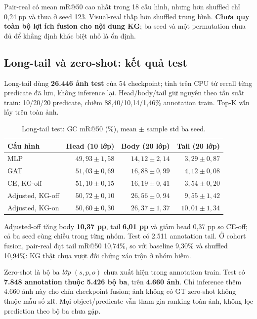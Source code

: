 Pair-real có mean mR@50 cao nhất trong 18 cấu hình, nhưng hơn shuffled
chỉ 0,24 pp và thua ở seed 123. Visual-real thấp hơn shuffled trung bình.
\textbf{Chưa quy toàn bộ lợi ích fusion cho nội dung KG};
ba seed và một permutation chưa đủ để khẳng định khác biệt nhỏ là ổn định.

\clearpage
\subsection{Long-tail và zero-shot: kết quả test}
Long-tail dùng \textbf{26.446 ảnh test} của 54 checkpoint; tính trên CPU từ
recall từng predicate đã lưu, không inference lại.
Head/body/tail giữ nguyên theo tần suất train: 10/20/20 predicate,
chiếm 88,40/10,14/1,46\% annotation train. Top-K vẫn lấy trên toàn ảnh.

\begin{table}[H]\centering\small
\caption{Long-tail test: GC mR@50 (\%), mean $\pm$ sample std ba seed.}\label{tab:tail}
\begin{tabular}{@{}lrrr@{}}\toprule
Cấu hình & Head (10 lớp) & Body (20 lớp) & Tail (20 lớp)\\\midrule
MLP & $49,93\pm1,58$ & $14,12\pm2,14$ & $3,29\pm0,87$\\
GAT & $51,03\pm0,69$ & $16,88\pm0,99$ & $4,12\pm0,08$\\
CE, KG-off & $51,10\pm0,15$ & $16,19\pm0,41$ & $3,54\pm0,20$\\
Adjusted, KG-off & $50,72\pm0,10$ & $26,56\pm0,94$ & $9,55\pm1,42$\\
Adjusted, KG-on & $50,60\pm0,30$ & $26,37\pm1,37$ & $10,01\pm1,34$\\
\bottomrule\end{tabular}\end{table}

Adjusted-off tăng body \textbf{10,37 pp}, tail \textbf{6,01 pp} và giảm head
0,37 pp so CE-off; cả ba seed cùng chiều trong từng nhóm.
Test có 2.511 annotation tail. Ở cohort fusion, pair-real đạt tail mR@50
10,74\%, so với baseline 9,30\% và shuffled 10,94\%:
KG thật chưa vượt đối chứng xáo trộn ở nhóm hiếm.

Zero-shot là bộ ba \emph{lớp} $(s,p,o)$ chưa xuất hiện trong annotation train.
Test có \textbf{7.848 annotation thuộc 5.426 bộ ba}, trên \textbf{4.660 ảnh}.
Chỉ inference thêm 4.660 ảnh này cho chín checkpoint fusion;
ảnh không có GT zero-shot không thuộc mẫu số zR. Mọi object/predicate vẫn tham gia
ranking toàn ảnh, không lọc prediction theo bộ ba chưa gặp.

